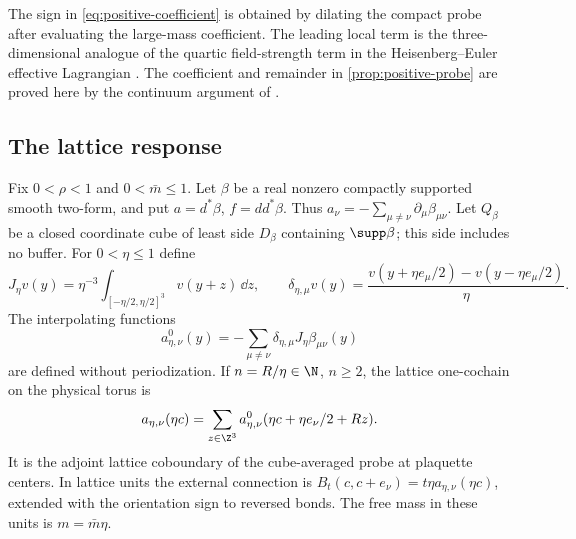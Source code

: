 \documentclass[11pt,letterpaper,reqno]{amsart}
\begin{document}
The sign in \eqref{eq:positive-coefficient} is obtained by dilating
the compact probe after evaluating the large-mass coefficient.
The leading local term is the three-dimensional analogue of the
quartic field-strength term in the Heisenberg--Euler effective
Lagrangian \cite{HeisenbergEuler1936}. The coefficient and remainder
in \cref{prop:positive-probe} are proved here by the continuum
argument of \cite[\S17]{QED3Master}.

\subsection{The lattice response}\label{subsec:response-conventions}

Fix $0<\rho<1$ and $0<\bar m\le1$. Let $\beta$ be a real nonzero compactly
supported smooth two-form, and put $a=d^*\beta$, $f=dd^*\beta$.
Thus $a_\nu=-\sum_{\mu\ne\nu}\partial_\mu\beta_{\mu\nu}$.
Let $Q_\beta$ be a closed coordinate cube of least side $D_\beta$
containing $\supp\beta$; this side includes no buffer. For $0<\eta\le1$
define
\[
 J_\eta v(y)=\eta^{-3}\int_{[-\eta/2,\eta/2]^3}v(y+z)\,\dd z,
 \qquad
 \delta_{\eta,\mu}v(y)=
      \frac{v(y+\eta e_\mu/2)-v(y-\eta e_\mu/2)}{\eta}.
\]
The interpolating functions
\begin{equation}\label{eq:response-lattice-probe}
 a_{\eta,\nu}^0(y)=-\sum_{\mu\ne\nu}
               \delta_{\eta,\mu}J_\eta\beta_{\mu\nu}(y)
\end{equation}
are defined without periodization. If $n=R/\eta\in\N$, $n\ge2$,
the lattice one-cochain on the physical torus is
\begin{equation}\label{eq:response-periodic-probe}
 a_{\eta,\nu}(\eta c)=\sum_{z\in\Z^3}
       a_{\eta,\nu}^0(\eta c+\eta e_\nu/2+Rz).
\end{equation}
It is the adjoint lattice coboundary of the cube-averaged probe
at plaquette centers. In lattice units the external connection
is $B_t(c,c+e_\nu)=t\eta a_{\eta,\nu}(\eta c)$, extended with
the orientation sign to reversed bonds. The free mass in
these units is $m=\bar m\eta$.
\end{document}
